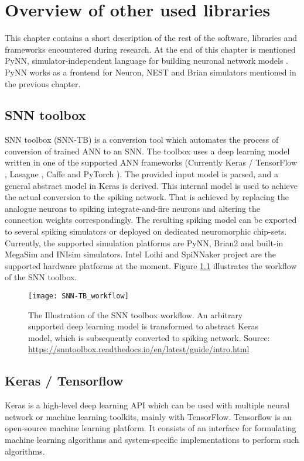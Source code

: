 \chapter{Overview of other used libraries} \label{chapter:04}

This chapter contains a short description of the rest of the software, libraries and frameworks encountered during research. At the end of this chapter is mentioned PyNN, simulator-independent language for building neuronal network models \cite{davisonPyNNCommonInterface2009}. PyNN works as a frontend for Neuron, NEST and Brian simulators mentioned in the previous chapter.

\section{SNN toolbox}
SNN toolbox (SNN-TB) \cite{rueckauerConversionContinuousValuedDeep2017} is a conversion tool which automates the process of conversion of trained ANN to an SNN. The toolbox uses a deep learning model written in one of the supported ANN frameworks (Currently Keras / TensorFlow \cite{cholletKeras15}, Lasagne \cite{sanderdielemanLasagneFirst15}, Caffe \cite{jiaCaffeConvolutional14} and PyTorch \cite{paszkePyTorchImperative19}). The provided input model is parsed, and a general abstract model in Keras is derived. This internal model is used to achieve the actual conversion to the spiking network. That is achieved by replacing the analogue neurons to spiking integrate-and-fire neurons and altering the connection weights correspondingly. The resulting spiking model can be exported to several spiking simulators or deployed on dedicated neuromorphic chip-sets. Currently, the supported simulation platforms are PyNN, Brian2 and built-in MegaSim and INIsim simulators. Intel Loihi and SpiNNaker project are the supported hardware platforms at the moment. Figure \ref{fig:snn-tb_workflow} illustrates the workflow of the SNN toolbox.

\begin{figure}[htbp]
    \centering
    \texttt{[image: SNN-TB\_workflow]}
    \caption{The Illustration of the SNN toolbox workflow. An arbitrary supported deep learning model is transformed to abstract Keras model, which is subsequently converted to spiking network. Source: \url{https://snntoolbox.readthedocs.io/en/latest/guide/intro.html}}
    \label{fig:snn-tb_workflow}
\end{figure}

\section{Keras / Tensorflow}
Keras is a high-level deep learning API which can be used with multiple neural network or machine learning toolkits, mainly with TensorFlow. Tensorflow is an open-source machine learning platform. It consists of an interface for formulating machine learning algorithms and system-specific implementations to perform such algorithms.

